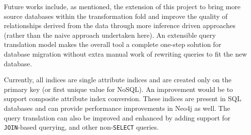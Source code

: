 \documentclass[12pt]{article}
\begin{document}
    Future works include, as mentioned, the extension of this project to bring more source databases within the transformation fold and improve the quality of relationships derived from the data through more inference driven approaches (rather than the naive approach undertaken here). An extensible query translation model makes the overall tool a complete one-step solution for database migration without extra manual work of rewriting queries to fit the new database. 
    
    Currently, all indices are single attribute indices and are created only on the primary key (or first unique value for NoSQL). An improvement would be to support composite attribute index conversion. These indices are present in SQL databases and can provide performance improvements in Neo4j as well. The query translation can also be improved and enhanced by adding support for \verb|JOIN|-based querying, and other non-\verb|SELECT| queries.


    \newpage

    
    
\end{document}
